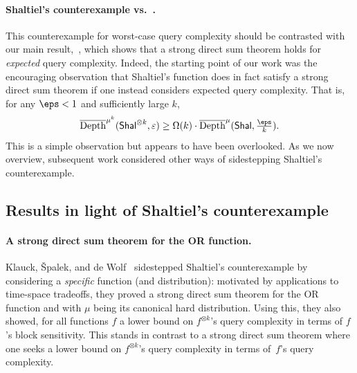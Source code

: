 \paragraph{Shaltiel's counterexample vs.~.} This counterexample for worst-case query complexity should be contrasted with our main result,~, which shows that a strong direct sum theorem holds for {\sl expected} query complexity. 
Indeed, the starting point of our work was the encouraging observation that Shaltiel's function does in fact satisfy a strong direct sum theorem if one instead considers expected query complexity. That is, for any $\eps < 1$ and sufficiently large $k$,
\[ \overline{\mathrm{Depth}}^{\mu^k}(\mathsf{Shal}^{\otimes k},\varepsilon) \ge \Omega(k) \cdot\overline{\mathrm{Depth}}^{\mu}(\mathsf{Shal},\tfrac{\eps}{k}).\]
This is a simple observation but appears to have been overlooked. As we now overview, subsequent work considered other ways of sidestepping Shaltiel's counterexample. 




\subsection{Results in light of Shaltiel's counterexample}

\paragraph{A strong direct sum theorem for the OR function.} Klauck, {\v{S}}palek, and de Wolf~\cite{KSdW07} sidestepped Shaltiel’s counterexample by considering a {\sl specific} function (and distribution): motivated by applications to time-space tradeoffs, they proved a strong direct sum theorem for the OR function and with $\mu$ being its canonical hard distribution. Using this, they also showed, for all functions $f$ a lower bound on $f^{\otimes k}$'s query complexity in terms of $f$’s block sensitivity. This stands in contrast to a strong direct sum theorem where one seeks a lower bound on $f^{\otimes k}$'s query complexity in terms of~$f$’s query complexity. 



